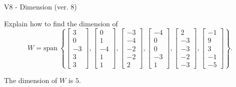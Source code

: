 \begin{exercise}
  \begin{exerciseTitle}V8 - Dimension (ver. 8)\end{exerciseTitle}
  \begin{exerciseStatement}
    Explain how to find the dimension of 
\[W=\mathrm{span}\ \left\{\left[\begin{array}{r}
3 \\
0 \\
-3 \\
3 \\
3
\end{array}\right] , \left[\begin{array}{r}
0 \\
1 \\
-4 \\
1 \\
1
\end{array}\right] , \left[\begin{array}{r}
-3 \\
-4 \\
-2 \\
-2 \\
2
\end{array}\right] , \left[\begin{array}{r}
-4 \\
0 \\
0 \\
-3 \\
1
\end{array}\right] , \left[\begin{array}{r}
2 \\
-3 \\
-3 \\
-2 \\
-3
\end{array}\right] , \left[\begin{array}{r}
-1 \\
9 \\
3 \\
-1 \\
-5
\end{array}\right]\right\}.\]



  \end{exerciseStatement}
  \begin{exerciseAnswer}
   The dimension of \(W\) is  \(5\).
  


  \end{exerciseAnswer}
\end{exercise}